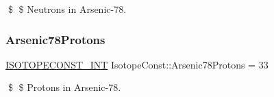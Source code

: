 \$ \$ Neutrons in Arsenic-\/78. \mbox{\label{group___isotope_const-_arsenic-_as78_gaced7bf0f21ca3e2027f5b0cfac0587a2}} 
\subsubsection{\texorpdfstring{Arsenic78\+Protons}{Arsenic78Protons}}
{\footnotesize\ttfamily \mbox{\hyperlink{group___isotope_const-_macros_ga5f18360b3e99483a35c32d789e62621c}{I\+S\+O\+T\+O\+P\+E\+C\+O\+N\+S\+T\+\_\+\+I\+NT}} Isotope\+Const\+::\+Arsenic78\+Protons = 33}

\$ \$ Protons in Arsenic-\/78. 